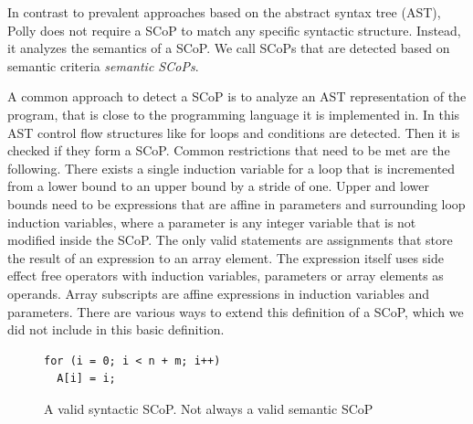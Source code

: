 \documentclass{acm_proc_article-sp}
\begin{document}
In contrast to prevalent approaches based on the abstract syntax
tree (AST), Polly does not require a SCoP to match any specific syntactic
structure. Instead, it analyzes the semantics of a SCoP. We call SCoPs
that are detected based on semantic criteria \emph{semantic SCoPs}.

A common approach to detect a SCoP is to analyze an AST representation of
the program, that is close to the programming language it is implemented in. In
this AST control flow structures like for loops and conditions are
detected. Then it is checked if they form a SCoP. Common restrictions that need
to be met are the following. There exists a single induction variable for a
loop that is incremented from a lower bound to an upper bound by a stride of
one. Upper and lower bounds need to be expressions that are affine in parameters
and surrounding loop induction variables, where a parameter is any integer
variable that is not modified inside the SCoP.  The only valid statements are
assignments that store the result of an expression to an array element. The
expression itself uses side effect free operators with induction variables,
parameters or array elements as operands.  Array subscripts are affine
expressions in induction variables and parameters. There are various ways to
extend this definition of a SCoP, which we did not include in this basic
definition.

\begin{figure}

\begin{verbatim}
for (i = 0; i < n + m; i++)
  A[i] = i;
\end{verbatim}
	\caption{A valid syntactic SCoP. Not always a valid semantic SCoP}
	\label{fig:syntacticScop}
\end{figure}
\end{document}
